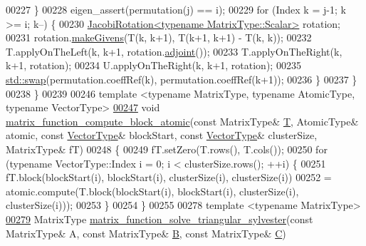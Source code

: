 \begin{DoxyCode}
00227     \}
00228     eigen\_assert(permutation(j) == i);
00229     \textcolor{keywordflow}{for} (Index k = j-1; k >= i; k--) \{
00230       \hyperlink{group___jacobi___module_class_eigen_1_1_jacobi_rotation}{JacobiRotation<typename MatrixType::Scalar>} rotation;
00231       rotation.\hyperlink{group___jacobi___module_af73c81e9cc139b7e0d877ce553b02ec0}{makeGivens}(T(k, k+1), T(k+1, k+1) - T(k, k));
00232       T.applyOnTheLeft(k, k+1, rotation.\hyperlink{group___jacobi___module_a89c8ea615f8fa77ddd5810a1e5fde4da}{adjoint}());
00233       T.applyOnTheRight(k, k+1, rotation);
00234       U.applyOnTheRight(k, k+1, rotation);
00235       \hyperlink{endian_8c_a3ca5ecd34b04d6a243c054ac3a57f68d}{std::swap}(permutation.coeffRef(k), permutation.coeffRef(k+1));
00236     \}
00237   \}
00238 \}
00239 
00246 \textcolor{keyword}{template} <\textcolor{keyword}{typename} MatrixType, \textcolor{keyword}{typename} AtomicType, \textcolor{keyword}{typename} VectorType>
\hyperlink{namespace_eigen_1_1internal_a53e617df189868a791e44d2c4e94403f}{00247} \textcolor{keywordtype}{void} \hyperlink{namespace_eigen_1_1internal_a53e617df189868a791e44d2c4e94403f}{matrix\_function\_compute\_block\_atomic}(\textcolor{keyword}{const} MatrixType& 
      \hyperlink{group___sparse_core___module}{T}, AtomicType& atomic, \textcolor{keyword}{const} \hyperlink{struct_vector_type}{VectorType}& blockStart, \textcolor{keyword}{const} \hyperlink{struct_vector_type}{VectorType}& clusterSize, 
      MatrixType& fT)
00248 \{ 
00249   fT.setZero(T.rows(), T.cols());
00250   \textcolor{keywordflow}{for} (\textcolor{keyword}{typename} VectorType::Index i = 0; i < clusterSize.rows(); ++i) \{
00251     fT.block(blockStart(i), blockStart(i), clusterSize(i), clusterSize(i))
00252       = atomic.compute(T.block(blockStart(i), blockStart(i), clusterSize(i), clusterSize(i)));
00253   \}
00254 \}
00255 
00278 \textcolor{keyword}{template} <\textcolor{keyword}{typename} MatrixType>
\hyperlink{namespace_eigen_1_1internal_a9f7e5b9803071057e7ed4e887da4a1bb}{00279} MatrixType \hyperlink{namespace_eigen_1_1internal_a9f7e5b9803071057e7ed4e887da4a1bb}{matrix\_function\_solve\_triangular\_sylvester}(\textcolor{keyword}{const} 
      MatrixType& A, \textcolor{keyword}{const} MatrixType& \hyperlink{group___core___module_class_eigen_1_1_matrix}{B}, \textcolor{keyword}{const} MatrixType& \hyperlink{group___core___module_class_eigen_1_1_matrix}{C})

\end{DoxyCode}
